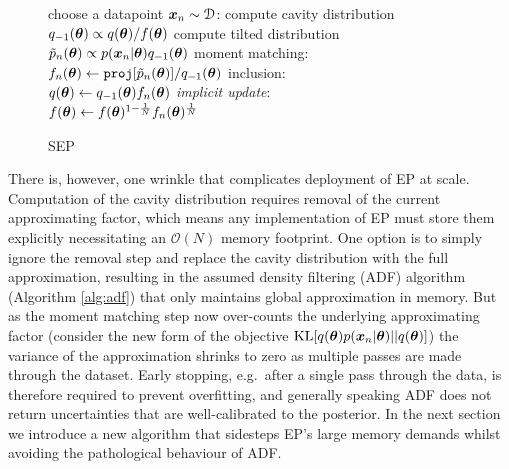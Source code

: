 \begin{figure}[!t]
\begin{minipage}[t]{0.32\linewidth}
\begin{algorithm}[H]
\end{algorithm}
\end{minipage}
\begin{minipage}[t]{0.32\linewidth}
\centering
\begin{algorithm}[H]
\caption{SEP} \small
\label{alg:sep} 
\begin{algorithmic}[1] 
	\STATE choose a datapoint $\bm{x}_n\sim \mathcal{D}$:
	\STATE compute cavity distribution \\ $q_{-1}(\bm{\theta}) \propto q(\bm{\theta}) / f(\bm{\theta})$
	\STATE compute tilted distribution \\$\tilde{p}_n(\bm{\theta}) \propto p(\bm{x}_n|\bm{\theta}) q_{-1}(\bm{\theta})$
	\STATE moment matching: \\\hspace{-5mm}$f_n(\bm{\theta}) \leftarrow \mathtt{proj}[\tilde{p}_n(\bm{\theta})] / q_{-1}(\bm{\theta}) $
	\STATE inclusion:\\ $q(\bm{\theta}) \leftarrow q_{-1}(\bm{\theta}) f_n(\bm{\theta})$
	\STATE \textit{implicit update}:\\ $f(\bm{\theta}) \leftarrow f(\bm{\theta})^{1 - \frac{1}{N}} f_n(\bm{\theta})^{\frac{1}{N}}$
\end{algorithmic}
\end{algorithm}
\end{minipage} 
%
\end{figure}

There is, however, one wrinkle that complicates deployment of EP at scale. Computation of the cavity distribution requires removal of the current approximating factor, which means any implementation of EP must store them explicitly necessitating an $\mathcal{O}(N)$ memory footprint. One option is to simply ignore the removal step and replace the cavity distribution with the full approximation, resulting in the assumed density filtering (ADF) algorithm (Algorithm \ref{alg:adf}) \citep{maybeck:adf1982} that only maintains global approximation in memory. But as the moment matching step now over-counts the underlying approximating factor (consider the new form of the objective $\mathrm{KL}[q(\bm{\theta}) p(\bm{x}_n | \bm{\theta}) || q(\bm{\theta})]$) the variance of the approximation shrinks to zero as multiple passes are made through the dataset. Early stopping, e.g.~after a single pass through the data, is therefore required to prevent overfitting, and generally speaking ADF does not return uncertainties that are well-calibrated to the posterior. 
%
In the next section we introduce a new algorithm that sidesteps EP's large memory demands whilst avoiding the pathological behaviour of ADF. 

